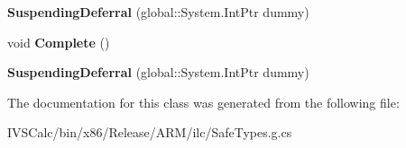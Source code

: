 \begin{DoxyCompactItemize}
{\bfseries Suspending\+Deferral} (global\+::\+System.\+Int\+Ptr dummy)
\item 
\mbox{\label{class_windows_1_1_application_model_1_1_suspending_deferral_a72ac14a5ced89f14f38cd577d6e1f0cb}} 
void {\bfseries Complete} ()
\item 
\mbox{\label{class_windows_1_1_application_model_1_1_suspending_deferral_a2d8bfe5f999f9112cabe5c6958b09508}} 
{\bfseries Suspending\+Deferral} (global\+::\+System.\+Int\+Ptr dummy)
\end{DoxyCompactItemize}


The documentation for this class was generated from the following file\+:\begin{DoxyCompactItemize}
\item 
I\+V\+S\+Calc/bin/x86/\+Release/\+A\+R\+M/ilc/Safe\+Types.\+g.\+cs\end{DoxyCompactItemize}
